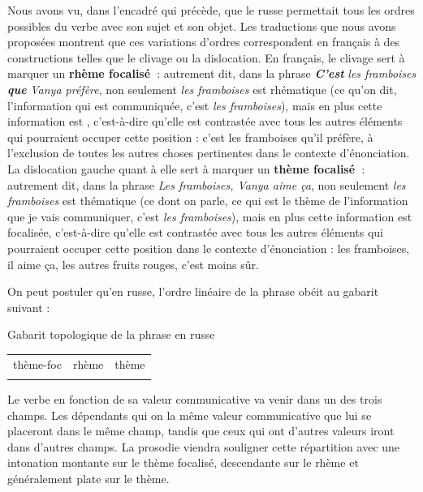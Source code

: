{    Nous avons vu, dans l’encadré qui précède, que le russe permettait tous les ordres possibles du verbe avec son sujet et son objet. Les traductions que nous avons proposées montrent que ces variations d’ordres correspondent en français à des constructions telles que le clivage ou la dislocation. En français, le clivage sert à marquer un \textbf{rhème focalisé~}: autrement dit, dans la phrase \textbf{\textit{C’est}} \textit{les framboises} \textbf{\textit{que}} \textit{Vanya préfère}, non seulement \textit{les framboises} est rhématique (ce qu’on dit, l’information qui est communiquée, c’est \textit{les framboises}), mais en plus cette information est , c’est-à-dire qu’elle est contrastée avec tous les autres éléments qui pourraient occuper cette position : c’est les framboises qu’il préfère, à l’exclusion de toutes les autres choses pertinentes dans le contexte d’énonciation. La dislocation gauche quant à elle sert à marquer un \textbf{thème focalisé~}: autrement dit, dans la phrase \textit{Les framboises, Vanya aime ça}, non seulement \textit{les framboises} est thématique (ce dont on parle, ce qui est le thème de l’information que je vais communiquer, c’est \textit{les framboises}), mais en plus cette information est focalisée, c’est-à-dire qu’elle est contrastée avec tous les autres éléments qui pourraient occuper cette position dans le contexte d’énonciation : les framboises, il aime ça, les autres fruits rouges, c’est moins sûr.

    On peut postuler qu’en russe, l’ordre linéaire de la phrase obéit au gabarit suivant :

    \ea Gabarit topologique de la phrase en russe\\
    \hfill
    \begin{tabular}{|c|c|c|}
    \hhline{---}
    thème-foc & rhème & thème\\
    \hhline{---}
    \end{tabular}
    \hfill\hbox{}\z


    Le verbe en fonction de sa valeur communicative va venir dans un des trois champs. Les dépendants qui on la même valeur communicative que lui se placeront dans le même champ, tandis que ceux qui ont d’autres valeurs iront dans d’autres champs. La prosodie viendra souligner cette répartition avec une intonation montante sur le thème focalisé, descendante sur le rhème et généralement plate sur le thème.

}
